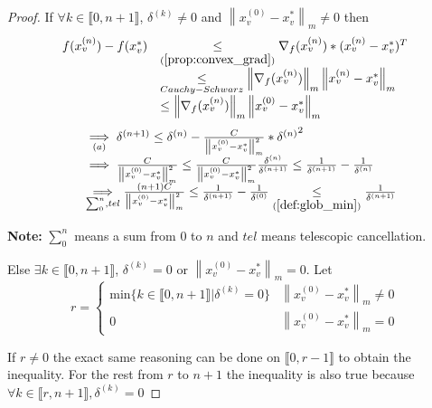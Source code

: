 \documentclass[11pt,en]{elegantpaper}
\newcommand{\norm}[1]{\left\lVert#1\right\rVert}
\begin{document}
\begin{proof}
  If $\forall k \in \llbracket 0,n+1 \rrbracket$, $\delta^{(k)} \neq 0$ and $\norm{x_v^{(0)} - x_v^*}_m \neq 0$ then
  \begin{equation*}
    \begin{array}{ll}
      f(x_v^{(n)}) - f(x_v^*) & \underset{(\ref{prop:convex_grad})}{\leq} \nabla_f(x_v^{(n)}) * (x_v^{(n)} - x_v^*)^T \\
      & \underset{Cauchy-Schwarz}{\leq} \norm{\nabla_f(x_v^{(n)})}_m \norm{x_v^{(n)} - x_v^*}_m \\
      & \leq \norm{\nabla_f(x_v^{(n)})}_m \norm{x_v^{(0)} - x_v^*}_m
    \end{array}
  \end{equation*}
  \begin{equation*}
    \begin{array}{ll}
      & \underset{(a)}{\implies} \delta^{(n+1)} \leq \delta^{(n)} - \frac{C}{\norm{x_v^{(0)} - x_v^*}_m^2} * {\delta^{(n)}}^2 \\
      & \implies \frac{C}{\norm{x_v^{(0)} - x_v^*}_m^2}
        \leq \frac{C}{\norm{x_v^{(0)} - x_v^*}_m^2} \frac{\delta^{(n)}}{\delta^{(n+1)}}
        \leq \frac{1}{\delta^{(n+1)}} - \frac{1}{\delta^{(n)}} \\
      & \underset{\sum_{0}^n,tel}\implies \frac{(n+1) C}{\norm{x_v^{(0)} - x_v^*}_m^2}
        \leq \frac{1}{\delta^{(n+1)}} - \frac{1}{\delta^{(0)}}
        \underset{(\ref{def:glob_min})}{\leq} \frac{1}{\delta^{(n+1)}}
    \end{array}
  \end{equation*} \par
  \textbf{Note:} $\sum_{0}^n$ means a sum from $0$ to $n$ and $tel$ means telescopic cancellation. \par

  Else $\exists k \in \llbracket 0,n+1 \rrbracket$, $\delta^{(k)} = 0$ or $\norm{x_v^{(0)} - x_v^*}_m = 0$.
  Let \begin{equation*}
    r = \left\{ \begin{array}{ll}
      \text{min} \{k \in \llbracket 0,n+1 \rrbracket | \delta^{(k)} = 0\} & \norm{x_v^{(0)} - x_v^*}_m \neq 0 \\
      0 & \norm{x_v^{(0)} - x_v^*}_m = 0
    \end{array} \right.
  \end{equation*} \par
  If $r \neq 0$ the exact same reasoning can be done on $\llbracket 0,r-1 \rrbracket$ to obtain the inequality.
  For the rest from $r$ to $n+1$ the inequality is also true because $\forall k \in \llbracket r,n+1 \rrbracket, \delta^{(k)} = 0$ \par

\end{proof}
\end{document}
